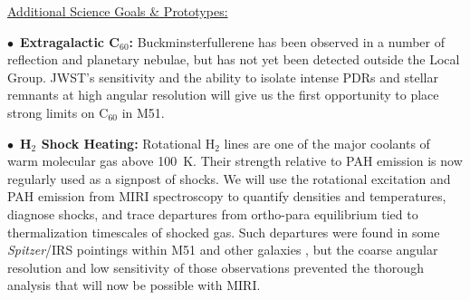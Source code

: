 \documentclass[12pt]{article}
\newenvironment{parhang}{\hangafter=1\hangindent=10pt}{\par}
\begin{document}


\noindent \underline{Additional Science Goals \& Prototypes:}

    \begin{parhang}
    \noindent
     \end{parhang}
     \begin{parhang}
     \noindent
    $\bullet$~{\bf Extragalactic C$_{60}$:} Buckminsterfullerene has been observed in a number of reflection and planetary nebulae, but has not yet been detected outside the Local Group.  JWST's sensitivity and the ability to isolate intense PDRs and stellar remnants at high angular resolution will give us the first opportunity to place strong limits on C$_{60}$ in M51.
    \end{parhang}
    \begin{parhang}
    \noindent
    $\bullet$~{\bf H$_2$ Shock Heating:} Rotational H$_2$ lines are one of the major coolants of warm molecular gas above 100~K. %
    Their strength relative to PAH emission is now regularly used as a signpost of shocks. %
    We will use the rotational excitation and PAH emission from MIRI spectroscopy to quantify densities and temperatures, diagnose shocks, and trace departures from ortho-para equilibrium tied to thermalization timescales of shocked gas. Such departures were found in some {\em Spitzer}/IRS pointings within M51 and other galaxies  \citep{roussel2007}, but  the coarse angular resolution and low sensitivity of those observations prevented the thorough analysis that will now be possible with MIRI.
    \end{parhang}
\end{document}
